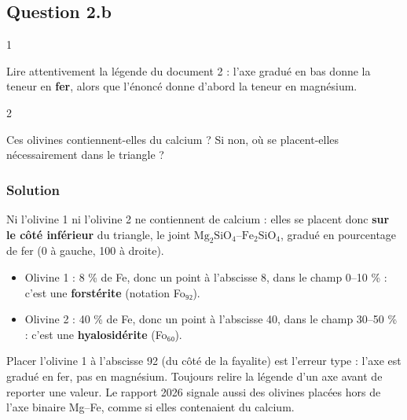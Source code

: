 \documentclass[11pt,a4paper]{article}
\providecommand{\tightlist}{\setlength{\itemsep}{0pt}\setlength{\parskip}{0pt}}
\begin{document}
\hypertarget{question-2.b}{%
\subsection{Question 2.b}\label{question-2.b}}

\begin{indication}{1}

Lire attentivement la légende du document 2 : l'axe gradué en bas donne la teneur en \textbf{fer}, alors que l'énoncé donne d'abord la teneur en magnésium.

\end{indication}

\begin{indication}{2}

Ces olivines contiennent-elles du calcium ? Si non, où se placent-elles nécessairement dans le triangle ?

\end{indication}

\hypertarget{solution-6}{%
\subsubsection{Solution}\label{solution-6}}

Ni l'olivine 1 ni l'olivine 2 ne contiennent de calcium : elles se placent donc \textbf{sur le côté inférieur} du triangle, le joint \(\mathrm{Mg_2SiO_4}\)--\(\mathrm{Fe_2SiO_4}\), gradué en pourcentage de fer (0 à gauche, 100 à droite).

\begin{itemize}
\tightlist
\item
  Olivine 1 : 8 \% de Fe, donc un point à l'abscisse 8, dans le champ 0--10 \% : c'est une \textbf{forstérite} (notation Fo₉₂).
\item
  Olivine 2 : 40 \% de Fe, donc un point à l'abscisse 40, dans le champ 30--50 \% : c'est une \textbf{hyalosidérite} (Fo₆₀).
\end{itemize}

\begin{piege}

Placer l'olivine 1 à l'abscisse 92 (du côté de la fayalite) est l'erreur type : l'axe est gradué en fer, pas en magnésium. Toujours relire la légende d'un axe avant de reporter une valeur. Le rapport 2026 signale aussi des olivines placées hors de l'axe binaire Mg--Fe, comme si elles contenaient du calcium.

\end{piege}
\end{document}
